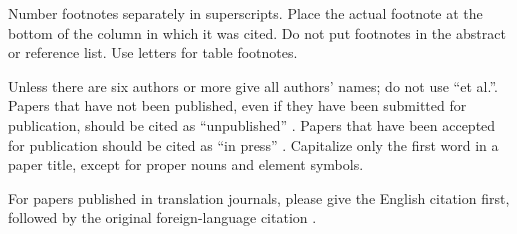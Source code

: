 \documentclass[journal,final,a4paper,twoside,11pt]{IEEEtran}
\begin{document}
Number footnotes separately in superscripts. Place the actual footnote at 
the bottom of the column in which it was cited. Do not put footnotes in the 
abstract or reference list. Use letters for table footnotes.

Unless there are six authors or more give all authors' names; do not use 
``et al.''. Papers that have not been published, even if they have been 
submitted for publication, should be cited as ``unpublished'' \cite{b4}. Papers 
that have been accepted for publication should be cited as ``in press'' \cite{b5}. 
Capitalize only the first word in a paper title, except for proper nouns and 
element symbols.

For papers published in translation journals, please give the English 
citation first, followed by the original foreign-language citation \cite{b6}.


 




\label{lastPage}
\end{document}

